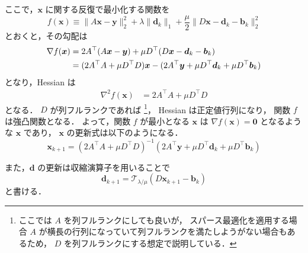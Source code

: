 ここで，$\bm{x}$ に関する反復で最小化する関数を
\begin{equation}
    f(\bm{x}) \equiv \|A \bm{x} - \bm{y}\|_2^2 + \lambda \|\bm{d}_k\|_1
    + \frac{\mu}{2} \|D \bm{x} - \bm{d}_k - \bm{b}_k\|_2^2
\end{equation}
とおくと，その勾配は
\begin{align}
    \nabla f(\bm{x})
     & =
    2 A^\top (A \bm{x} - \bm{y}) + \mu D^\top (D \bm{x} - \bm{d}_k - \bm{b}_k)
    \notag \\
     & =
    (2 A^\top A + \mu D^\top D) \bm{x}
    - (2 A^\top \bm{y} + \mu D^\top \bm{d}_k + \mu D^\top \bm{b}_k)
\end{align}
となり，Hessian は
\begin{align}
    \nabla^2 f(\bm{x})
     & =
    2 A^\top A + \mu D^\top D
\end{align}
となる．
$D$ が列フルランクであれば
\footnote{ここでは $A$ を列フルランクにしても良いが，%
    スパース最適化を適用する場合 $A$ が横長の行列になっていて列フルランクを満たしようがない場合もあるため，%
    $D$ を列フルランクにする想定で説明している．}，
Hessian は正定値行列になり，
関数 $f$ は強凸関数となる．
よって，関数 $f$ が最小となる $\bm{x}$ は $\nabla f(\bm{x}) = \bm{0}$ となるような $\bm{x}$ であり，
$\bm{x}$ の更新式は以下のようになる．
\begin{equation}
    \bm{x}_{k+1} =
    (2 A^\top A + \mu D^\top D)^{-1}
    (2 A^\top \bm{y} + \mu D^\top \bm{d}_k + \mu D^\top \bm{b}_k)
\end{equation}

また，$\bm{d}$ の更新は収縮演算子を用いることで
\begin{equation}
    \bm{d}_{k+1} = \mathcal{T}_{\lambda / \mu} (D\bm{x}_{k+1} - \bm{b}_k)
\end{equation}
と書ける．
